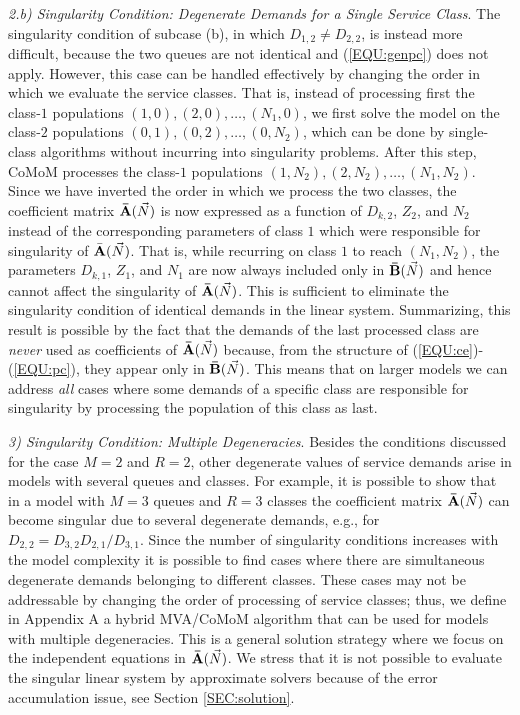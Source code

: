 \documentclass[journal,twocolumn,9.5pt]{IEEEtran}
\newcommand{\comom}[1]{\bar{#1}}
\begin{document}
{\em 2.b) Singularity Condition: Degenerate Demands for a Single Service Class}. The singularity condition of subcase (b), in which $D_{1,2}\neq D_{2,2}$, is instead more difficult, because the two queues are not identical and (\ref{EQU:genpc}) does not apply. However, this case can be handled effectively by changing the order in which we evaluate the service classes. That is, instead of processing first the class-$1$ populations $(1,0),(2,0),\ldots, (N_1,0)$, we first solve the model on the class-$2$ populations $(0,1),(0,2),\ldots, (0,N_2)$, which can be done  by single-class algorithms without incurring into singularity problems. After this step, CoMoM processes the class-$1$ populations $(1,N_2),(2,N_2),\ldots, (N_1,N_2)$. Since we have inverted the order in which we process the two classes, the coefficient matrix ${\bf \comom{A}}(\vec N)$ is now expressed as a function of $D_{k,2}$, $Z_2$, and $N_2$ instead of the corresponding parameters of class $1$ which were responsible for singularity of $\comom{\bf A}(\vec N)$. That is, while recurring on class $1$ to reach $(N_1,N_2)$, the parameters $D_{k,1}$, $Z_1$, and $N_1$ are now always included only in ${\bf \comom{B}}(\vec N)$ and hence cannot affect the singularity of ${\bf \comom{A}}(\vec N)$. This is sufficient to eliminate the singularity condition of identical demands in the linear system. Summarizing, this result is possible by the fact that the demands of the last processed class are {\em never} used as coefficients of ${\bf \comom{A}}(\vec N)$ because, from the structure of (\ref{EQU:ce})-(\ref{EQU:pc}), they appear only in ${\bf \comom{B}}(\vec N)$. This means that on larger models we can address {\em all} cases where some demands of a specific class are responsible for singularity by processing the population of this class as last.

{\em 3) Singularity Condition: Multiple Degeneracies}. Besides the conditions discussed for the case $M=2$ and $R=2$, other degenerate values of service demands arise in models with several queues and classes. For example, it is possible to show that in a model with $M=3$ queues and $R=3$ classes the coefficient matrix ${\bf \comom{A}}(\vec N)$ can become singular due to several degenerate demands, e.g., for $D_{2,2}=D_{3,2}D_{2,1}/D_{3,1}$. Since the number of singularity conditions increases with the model complexity it is possible to find cases where there are simultaneous degenerate demands belonging to different classes. These cases may not be addressable by changing the order of processing of service classes; thus, we define in Appendix A a hybrid MVA/CoMoM algorithm that can be used for models with multiple degeneracies. This is a general solution strategy where we focus on the independent equations in ${\bf \comom{A}}(\vec N)$. We stress that it is not possible to evaluate the singular linear system by approximate solvers because of the error accumulation issue, see Section \ref{SEC:solution}.
\end{document}
